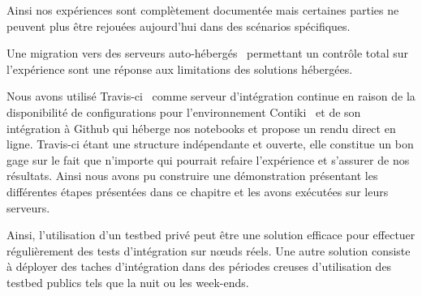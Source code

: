 Ainsi nos expériences sont complètement documentée mais certaines parties ne peuvent plus être rejouées aujourd'hui dans des scénarios spécifiques.

Une migration vers des serveurs auto-hébergés~\cite{smart2011jenkins} permettant un contrôle total sur l'expérience sont une réponse aux limitations des solutions hébergées.

Nous avons utilisé Travis-ci~\cite{travis} comme serveur d'intégration continue en raison de la disponibilité de configurations pour l'environnement Contiki~\cite{contiki_travis} et de son intégration à Github qui héberge nos notebooks et propose un rendu direct en ligne.
Travis-ci étant une structure indépendante et ouverte, elle constitue un bon gage sur le fait que n'importe qui pourrait refaire l'expérience et s'assurer de nos résultats. 
Ainsi nous avons pu construire une démonstration présentant les différentes étapes présentées dans ce chapitre et les avons exécutées sur leurs serveurs. 

Ainsi, l'utilisation d'un testbed privé peut être une solution efficace pour effectuer régulièrement des tests d'intégration sur nœuds réels.
Une autre solution consiste à déployer des taches d'intégration dans des périodes creuses d'utilisation des testbed publics tels que la nuit ou les week-ends.
